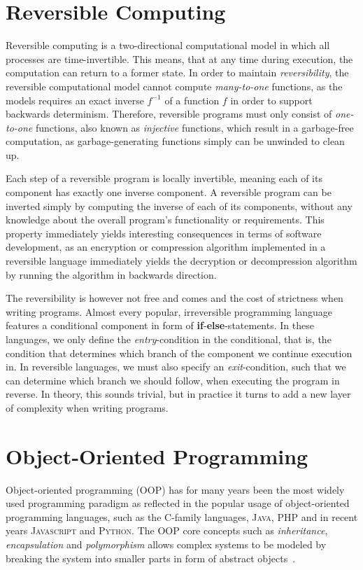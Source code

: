 \section{Reversible Computing}
\label{sec:reversible-computing}
Reversible computing is a two-directional computational model in which all processes are time-invertible. This means, that at any time during execution, the computation can return to a former state. In order to maintain \textit{reversibility}, the reversible computational model cannot compute \textit{many-to-one} functions, as the models requires an exact inverse $f^{-1}$ of a function $f$ in order to support backwards determinism. Therefore, reversible programs must only consist of \textit{one-to-one} functions, also known as \textit{injective} functions, which result in a garbage-free computation, as garbage-generating functions simply can be unwinded to clean up.

Each step of a reversible program is locally invertible, meaning each of its component has exactly one inverse component. A reversible program can be inverted simply by computing the inverse of each of its components, without any knowledge about the overall program's functionality or requirements. This property immediately yields interesting consequences in terms of software development, as an encryption or compression algorithm implemented in a reversible language immediately yields the decryption or decompression algorithm by running the algorithm in backwards direction.

The reversibility is however not free and comes and the cost of strictness when writing programs. Almost every popular, irreversible programming language features a conditional component in form of \textbf{if}-\textbf{else}-statements. In these languages, we only define the \textit{entry}-condition in the conditional, that is, the condition that determines which branch of the component we continue execution in. In reversible languages, we must also specify an \textit{exit}-condition, such that we can determine which branch we should follow, when executing the program in reverse. In theory, this sounds trivial, but in practice it turns to add a new layer of complexity when writing programs.


\section{Object-Oriented Programming}
\label{sec:object-oriented-programming}
Object-oriented programming (OOP) has for many years been the most widely used programming paradigm as reflected in the popular usage of object-oriented programming languages, such as the \textsc{C}-family languages, \textsc{Java}, \textsc{PHP} and in recent years \textsc{Javascript} and \textsc{Python}. The OOP core concepts such as \textit{inheritance}, \textit{encapsulation} and \textit{polymorphism} allows complex systems to be modeled by breaking the system into smaller parts in form of abstract objects~\cite{jm:concepts}.


